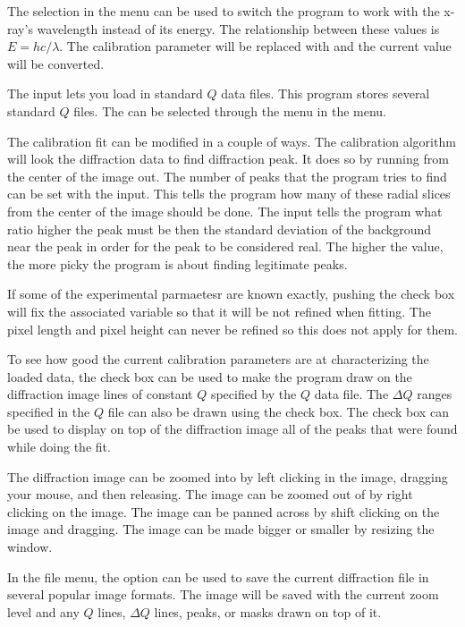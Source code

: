 The  selection in the  menu can
be used to switch the program to work with the x-ray's
wavelength instead of its energy. The relationship 
between these values is $E=hc/\lambda$. The calibration parameter 
 will be replaced with \gui{$\lambda$:} and the current 
value will be converted. 

The  input lets you load in standard $Q$ data files. 
This program stores several standard $Q$ files. The can be selected
through the  menu in the  menu.

The calibration fit can be modified in a couple of ways.
The calibration algorithm will look 
the diffraction data to find diffraction peak. It does so by
running from the center of the image out. 
The number of peaks that the program tries to find can be
set with the  input.
This tells the program how many of these radial slices from 
the center of the image should be done. The  input 
tells the program what ratio higher the peak must be then the 
standard deviation of the background near the peak in order for the
peak to be considered real. The higher the value, the more
picky the program is about finding legitimate peaks.

If some of the experimental parmaetesr are known exactly, 
pushing the  check box will fix the associated 
variable so that it will be not refined when fitting. The pixel 
length and pixel height can never be refined so this does not
apply for them.

To see how good the current calibration parameters are at
characterizing the loaded data, the  
check box can be used to make the program draw
on the diffraction image lines of constant $Q$ specified
by the $Q$ data file. The $\Delta Q$ ranges specified in 
the $Q$ file can also be drawn using the  
check box. The  check box can be used to 
display on top of the diffraction image all of the peaks that
were found while doing the fit.

The diffraction image can be zoomed into by left clicking
in the image, dragging your mouse, and then releasing.
The image can be zoomed out of by right clicking on the image. 
The image can be panned across by shift clicking on the image 
and dragging. The image can be made bigger or smaller by 
resizing the window.

In the file menu, the  option can be used 
to save the current diffraction file in several popular
image formats. The image will be saved with the current
zoom level and any $Q$ lines, $\Delta Q$ lines, peaks, or
masks drawn on top of it.


